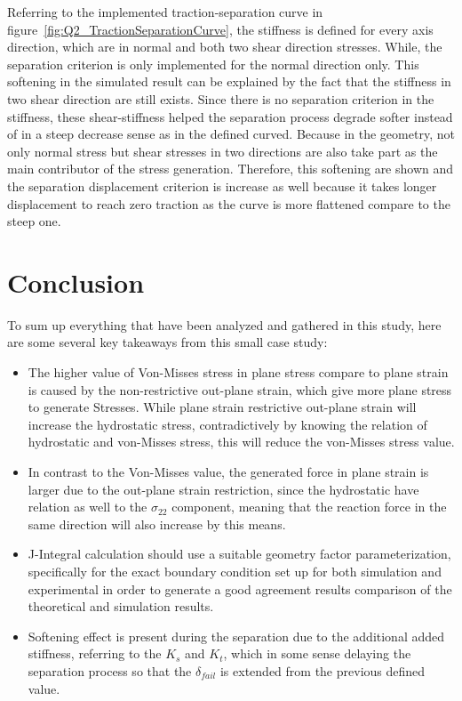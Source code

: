 \documentclass[12pt]{article}
\begin{document}
\hspace{2em}Referring to the implemented traction-separation curve in figure~\ref{fig:Q2_TractionSeparationCurve}, the stiffness is defined for every
axis direction, which are in normal and both two shear direction stresses. While, the separation criterion is only implemented for
the normal direction only. This softening in the simulated result can be explained by the fact that the 
stiffness in two shear direction are still exists. Since there is no separation criterion in the stiffness, these shear-stiffness helped the separation process degrade softer instead of in a steep decrease sense as in the defined
curved. Because in the geometry, not only normal stress but shear stresses in two directions are also take part as the main contributor of the stress generation. Therefore, this softening are shown and the separation displacement
criterion is increase as well because it takes longer displacement to reach zero traction as the curve is more flattened compare to the steep one.


\section*{Conclusion}
To sum up everything that have been analyzed and gathered in this study, 
here are some several key takeaways from this small case study:
\begin{itemize}
  \item The higher value of Von-Misses stress in plane stress compare to plane strain is caused by the non-restrictive out-plane strain, which give more plane stress to generate Stresses. While plane strain restrictive out-plane strain will increase the hydrostatic stress, contradictively by knowing the relation of hydrostatic and von-Misses stress, this will reduce the von-Misses stress value. 
  \item In contrast to the Von-Misses value, the generated force in plane strain is larger due to the out-plane strain restriction, since the hydrostatic have relation as well to the $\sigma_{22}$ component, meaning that the reaction force in the same direction will also increase by this means.
  \item J-Integral calculation should use a suitable geometry factor parameterization, specifically for the exact boundary condition set up for both simulation and experimental in order to generate a good agreement results comparison of the theoretical and simulation results.
  \item Softening effect is present during the separation due to the additional added stiffness, referring to the $K_s$ and $K_t$, which in some sense delaying the separation process so that the $\delta_{fail}$ is extended from the previous defined value. 
\end{itemize}

\printbibliography
\end{document}
